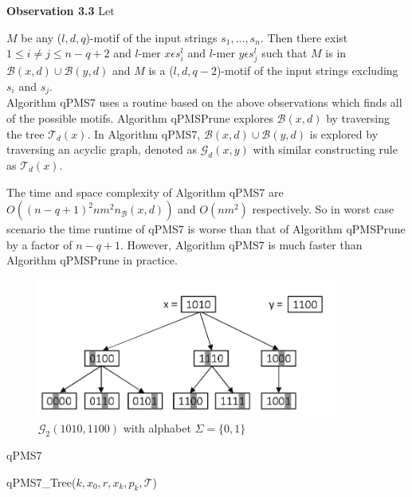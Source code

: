 \textbf{Observation 3.3} Let {$M$ be any ($l,d,q$)-motif of the input strings
$s_1,\dots,s_n$. Then there exist $1\leq i\neq j\leq n-q+2$ and $l$-mer $x\epsilon s_{i}^{l}$ and $l$-mer $y\epsilon s_{j}^{l}$ such that $M$ is in $\mathcal{B}(x,d) \cup \mathcal{B}(y,d)$ and $M$ is a ($l, d, q-2$)-motif of the input strings excluding $s_i$ and $s_j$.\\

Algorithm qPMS7 uses a routine based on the above observations which finds all of the possible motifs. Algorithm qPMSPrune explores $\mathcal{B}(x,d)$ by traversing the tree $\mathcal{T}_{d}(x)$. In Algorithm qPMS7, $\mathcal{B}(x,d)\cup \mathcal{B}(y,d)$ is explored by traversing an acyclic graph, denoted as $\mathcal{G}_{d}(x,y)$ with similar constructing rule as $\mathcal{T}_{d}(x)$.


The time and space complexity of Algorithm qPMS7 are $O((n-q+1)^{2}nm^{2}
n_{\mathcal{B}}(x,d))$ and $O(nm^2)$ respectively. So in worst case scenario the time runtime of qPMS7 is worse than that of Algorithm qPMSPrune by a factor of $n-q+1$. However, Algorithm qPMS7 is much faster than Algorithm qPMSPrune in practice.


\begin{figure}[!tb]
	\centering
	\includegraphics[width=0.9\textwidth]{figures/qpms7}
	\caption{$\mathcal{G}_{2}(1010,1100)$ with alphabet $\Sigma =\{0,1\}$}
	\label{fig:qpms7}
\end{figure}

\begin{algorithm}[H]
	\caption{qPMS7}
	\label{qpms7}
	\begin{algorithmic}[1]
		
	\end{algorithmic}
\end{algorithm}


\begin{algorithm}[H]
	\caption{qPMS7\_Tree($k,x_{0},r,x_k,p_k,\mathcal{T}$)}
	\label{qpms7_tree}
	\begin{algorithmic}[1]
		
	\end{algorithmic}
\end{algorithm}


}
